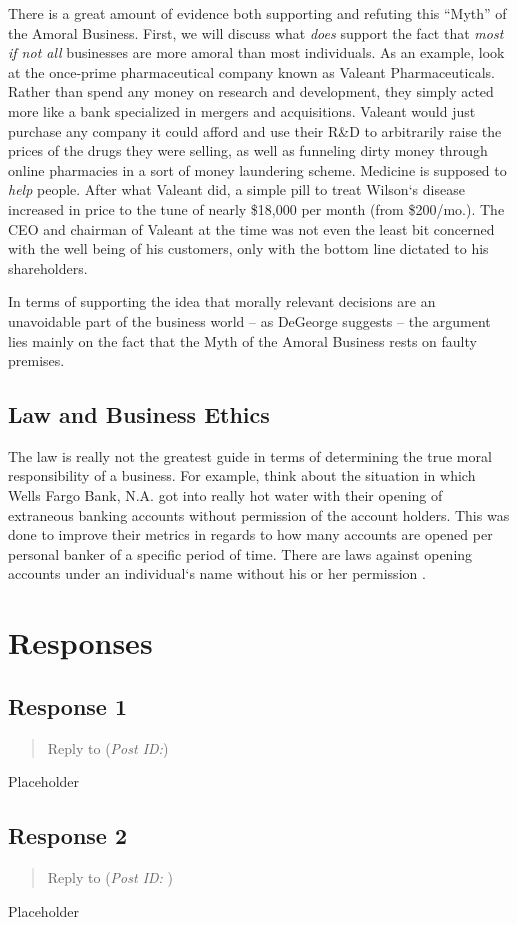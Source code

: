 \documentclass[12pt]{article}
\begin{document}
      There is a great amount of evidence both supporting and refuting this ``Myth'' of the
        Amoral Business. First, we will discuss what \textit{does} support the fact that
        \textit{most if not all} businesses are more amoral than most individuals. As
        an example, look at the once-prime pharmaceutical company known as Valeant Pharmaceuticals.
        Rather than spend any money on research and development, they simply acted more like a
        bank specialized in mergers and acquisitions. Valeant would just purchase any company
        it could afford and use their R\&D to arbitrarily raise the prices of the drugs they
        were selling, as well as funneling dirty money through online pharmacies in a sort
        of money laundering scheme. Medicine is supposed to \textit{help} people. After
        what Valeant did, a simple pill to treat Wilson`s disease increased in price to the
        tune of nearly \$18,000 per month (from \$200/mo.). The CEO and chairman of Valeant at
        the time was not even the least bit concerned with the well being of his customers,
        only with the bottom line dictated to his shareholders.
        
      In terms of supporting the idea that morally relevant decisions are an unavoidable part
        of the business world -- as DeGeorge suggests -- the argument lies mainly on the fact that
        the Myth of the Amoral Business rests on faulty premises.
        
      \subsection{Law and Business Ethics}
        The law is really not the greatest guide in terms of determining the true moral
          responsibility of a business. For example, think about the situation in which
          Wells Fargo Bank, N.A. got into really hot water with their opening of extraneous
          banking accounts without permission of the account holders. This was done to
          improve their metrics in regards to how many accounts are opened per personal
          banker of a specific period of time. There are laws against opening accounts
          under an individual`s name without his or her permission \autocite{mclean_2017}.
    \newpage
  \section{Responses}

    \subsection{Response 1}
      \begin{quote}
        Reply to \textbf{} (\textit{Post ID:})
      \end{quote}
      Placeholder

    \subsection{Response 2}
      \begin{quote}
        Reply to \textbf{} (\textit{Post ID: }) 
      \end{quote}
      Placeholder

  \newpage
  \printbibliography[
    heading=bibintoc,
    title={Works Cited}
  ]
\end{document}
